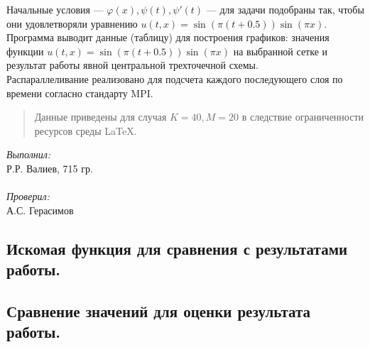 \documentclass[12pt, a4paper, final]{article}
\begin{document}
Начальные условия --- $ \varphi(x), \psi(t), \psi'(t) $ --- для задачи подобраны так, чтобы они удовлетворяли уравнению $ u(t, x) = \sin(\pi (t + 0.5)) \sin(\pi x) $.\\

Программа выводит данные (таблицу) для построения графиков: значения функции $ u(t, x) = \sin(\pi (t + 0.5)) \sin(\pi x) $ на выбранной сетке и результат работы явной центральной трехточечной схемы.\\

Распараллеливание реализовано для подсчета каждого последующего слоя по времени согласно стандарту MPI.

\begin{quote}
Данные приведены для случая $ K = 40, M = 20 $ в следствие ограниченности ресурсов среды \LaTeX.
\end{quote}

\vfill

\begin{minipage}[b]{0.33\textwidth}
    \textit{Выполнил:}\\
    Р.Р. Валиев, 715 гр.\\\\
    \textit{Проверил:}\\
    А.С. Герасимов
\end{minipage}

\newpage

{\centering \subsection*{Искомая функция для сравнения с результатами работы.}}

\begin{center}
\end{center}

{\centering \subsection*{Сравнение значений для оценки результата работы.}}
\end{document}
